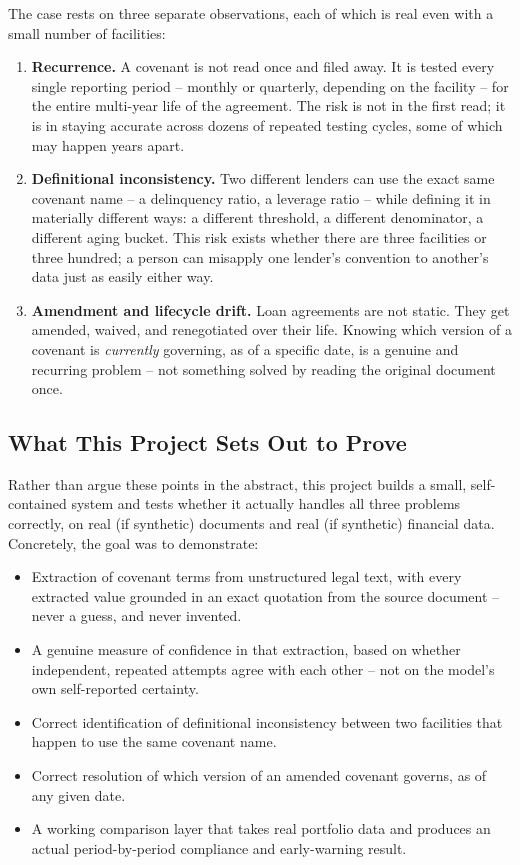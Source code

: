 \documentclass[11pt,a4paper]{article}
\begin{document}
The case rests on three separate observations, each of which is real even with a small number of facilities:

\begin{enumerate}[leftmargin=1.4em]
\item \textbf{Recurrence.} A covenant is not read once and filed away. It is tested every single reporting period -- monthly or quarterly, depending on the facility -- for the entire multi-year life of the agreement. The risk is not in the first read; it is in staying accurate across dozens of repeated testing cycles, some of which may happen years apart.
\item \textbf{Definitional inconsistency.} Two different lenders can use the exact same covenant name -- a delinquency ratio, a leverage ratio -- while defining it in materially different ways: a different threshold, a different denominator, a different aging bucket. This risk exists whether there are three facilities or three hundred; a person can misapply one lender's convention to another's data just as easily either way.
\item \textbf{Amendment and lifecycle drift.} Loan agreements are not static. They get amended, waived, and renegotiated over their life. Knowing which version of a covenant is \emph{currently} governing, as of a specific date, is a genuine and recurring problem -- not something solved by reading the original document once.
\end{enumerate}

\subsection{What This Project Sets Out to Prove}

Rather than argue these points in the abstract, this project builds a small, self-contained system and tests whether it actually handles all three problems correctly, on real (if synthetic) documents and real (if synthetic) financial data. Concretely, the goal was to demonstrate:

\begin{itemize}[leftmargin=1.4em]
\item Extraction of covenant terms from unstructured legal text, with every extracted value grounded in an exact quotation from the source document -- never a guess, and never invented.
\item A genuine measure of confidence in that extraction, based on whether independent, repeated attempts agree with each other -- not on the model's own self-reported certainty.
\item Correct identification of definitional inconsistency between two facilities that happen to use the same covenant name.
\item Correct resolution of which version of an amended covenant governs, as of any given date.
\item A working comparison layer that takes real portfolio data and produces an actual period-by-period compliance and early-warning result.
\end{itemize}
\end{document}
